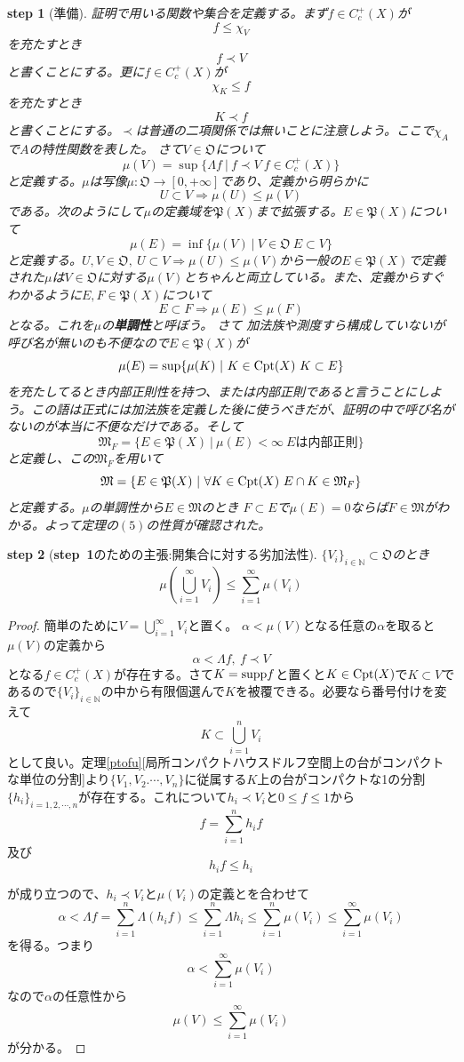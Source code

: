 \documentclass[leqno]{jsarticle}
\newtheorem{stp}{{\bf step}}
\newcommand{\To}{\Longrightarrow}
\newcommand{\nn}{\mathbb{N}}
\newcommand{\mgn}{\infty}
\newcommand{\dpst}{\displaystyle}
\newcommand{\supp}{\text{{\rm supp}}}
\newcommand{\mm}{\mathfrak{M}}
\newcommand{\mf}{\mathfrak{M}_F}
\newcommand{\pw}{\mathfrak{P}(X)}
\newcommand{\la}{\Lambda}
\newcommand{\cpt}{{\rm Cpt}(X)}
\newcommand{\oo}{\mathfrak{O}}
\newcommand{\praf}{C_c^{+}(X)}
\newcommand{\al}{\alpha}
\begin{document}
\begin{stp}[準備]\label{0}証明で用いる関数や集合を定義する。まず$f\in\praf$が
\[
f\le \chi_V
\]
を充たすとき
\[
f\prec V
\]
と書くことにする。更に$f\in \praf$が
\[
\chi_K\le f
\]
を充たすとき
\[
K\prec f 
\]
と書くことにする。$\prec$は普通の二項関係では無いことに注意しよう。ここで$\chi_A$で$A$の特性関数を表した。
さて$V\in \oo$について
\[
\mu(V)=\sup\{\la f\ |\ f\prec V\ f\in\praf\}
\]
と定義する。$\mu$は写像$\mu:\oo\to [0,+\mgn]$であり、定義から明らかに
\[
U\subset V\To \mu(U)\le \mu(V)
\]
である。次のようにして$\mu$の定義域を$\pw$まで拡張する。$E\in \pw$について
\[
\mu(E)=\inf\{\mu(V)\ |\ V\in \oo\ E\subset V\}
\]
と定義する。$U,V\in\oo,\ U\subset V\To \mu(U)\le \mu(V)$から一般の$E\in \pw$で定義された$\mu$は$V\in \oo$に対する$\mu(V)$とちゃんと両立している。また、定義からすぐわかるように$E,F\in\pw$について
\[
E\subset F\To \mu(E)\le \mu(F)
\]
となる。これを$\mu$の\textbf{単調性}と呼ぼう。
さて
加法族や測度すら構成していないが呼び名が無いのも不便なので$E\in \pw$が
\[
\mu(E)=\sup\{\mu(K)\ |\ K\in \cpt\ K\subset E\}
\]
を充たしてるとき内部正則性を持つ、または内部正則であると言うことにしよう。この語は正式には加法族を定義した後に使うべきだが、証明の中で呼び名がないのが本当に不便なだけである。そして
\[
\mf=\{E\in\pw\ |\ \mu(E)<\mgn\ E は内部正則\}
\]
と定義し、この$\mf$を用いて
\[
\mm=\{E\in \pw\ |\ \forall K\in \cpt\ E\cap K\in \mf \}
\]
と定義する。$\mu$の単調性から$E\in\mm$のとき $F\subset E$で$\mu(E)=0$ならば$ F\in \mm$がわかる。よって定理の$(5)$の性質が確認された。
\end{stp}


\begin{stp}[{\bf step\ 1}のための主張:開集合に対する劣加法性]
$\{V_i\}_{i\in\nn}\subset\oo$のとき
\[
\mu(\bigcup_{i=1}^{\mgn}V_i)\le\sum_{i=1}^{\mgn}\mu(V_i)
\]
\end{stp}
\begin{proof}簡単のために$\dpst V=\bigcup_{i=1}^{\mgn}V_i$と置く。
$\al<\mu(V)$となる任意の$\al$を取ると$\mu(V)$の定義から
\[
\al<\la f,\ f\prec V
\]
となる$f\in \praf$が存在する。さて$K=\supp f$と置くと$K\in\cpt$で$K\subset V$であるので$\{V_i\}_{i\in\nn}$の中から有限個選んで$K$を被覆できる。必要なら番号付けを変えて
\[
K\subset \bigcup_{i=1}^nV_i
\]
として良い。定理\ref{ptofu}[局所コンパクトハウスドルフ空間上の台がコンパクトな単位の分割]より$\{V_1,V_2.\cdots ,V_n\}$に従属する$K$上の台がコンパクトな1の分割$\{h_i\}_{i=1,2,\cdots ,n}$が存在する。これについて$h_i\prec V_i$と$0\le f\le 1$から
\[
f=\sum_{i=1}^nh_if
\]
及び\[
h_if\le h_i
\]

が成り立つので、$h_i\prec V_i$と$\mu(V_i)$の定義とを合わせて
\[
\al <\la f=\sum_{i=1}^n\la (h_if) \le\sum_{i=1}^n\la h_i\le \sum_{i=1}^n\mu(V_i)\le \sum_{i=1}^{\mgn}\mu(V_i)
\]
を得る。つまり
\[
\al <\sum_{i=1}^{\mgn}\mu(V_i)
\]なので$\al$の任意性から
\[
\mu(V)\le\sum_{i=1}^{\mgn}\mu(V_i)
\]
が分かる。
\end{proof}
\end{document}
